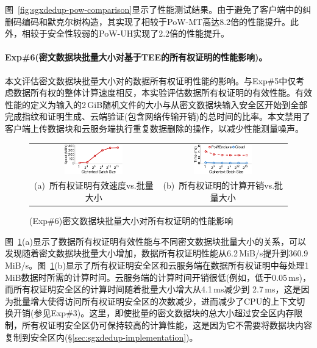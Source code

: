 图~\ref{fig:sgxdedup-pow-comparison}显示了性能测试结果。由于\sysnameS 避免了客户端中的纠删码编码和默克尔树构造，其实现了相较于PoW-MT高达8.2倍的性能提升。此外，\sysnameS 相较于安全性较弱的PoW-UH实现了2.2倍的性能提升。

\paragraph*{Exp\#6(密文数据块批量大小对基于TEE的所有权证明的性能影响)。}本文评估密文数据块批量大小对\sysnameS 的数据所有权证明性能的影响。与Exp\#5中仅考虑数据所有权的整体计算速度相反，本实验评估数据所有权证明的有效性能。有效性能的定义为输入的2\,GiB随机文件的大小与从密文数据块输入安全区开始到全部完成指纹和证明生成、云端验证(包含网络传输开销)的总时间的比率。本文禁用了客户端上传数据块和云服务端执行重复数据删除的操作，以减少性能测量噪声。

\begin{figure}[!htb]
    \centering
    \begin{tabular}{@{\ }c@{\ }c}
        \includegraphics[width=0.48\textwidth]{pic/sgxdedup/expa4_powBatchSize_overall.pdf} & 
        \includegraphics[width=0.48\textwidth]{pic/sgxdedup/expa4_powBatchSize_breakdown.pdf}  \\
        \mbox{\parbox{0.48\textwidth}{\small (a) 所有权证明有效速度vs.批量大小}}            & 
        \mbox{\parbox{0.48\textwidth}{\small (b) 所有权证明的计算开销vs.批量大小}}
    \end{tabular}
    \caption{(Exp\#6)密文数据块批量大小对所有权证明的性能影响}
    \label{fig:sgxdedup-exp-pow-impact}
\end{figure}

图~\ref{fig:sgxdedup-exp-pow-impact}(a)显示了数据所有权证明有效性能与不同密文数据块批量大小的关系，可以发现随着密文数据块批量大小增加，数据所有权证明性能从6.2\,MiB/s提升到360.9\,MiB/s。图~\ref{fig:sgxdedup-exp-pow-impact}(b)显示了所有权证明安全区和云服务端在数据所有权证明中每处理1\,MiB数据时所需的计算时间。云服务端的计算时间开销很低(例如，低于0.05\,ms)，而所有权证明安全区的计算时间随着批量大小增大从4.1\,ms减少到 2.7\,ms，这是因为批量增大使得访问所有权证明安全区的次数减少，进而减少了CPU的上下文切换开销(参见Exp\#3)。这里，即使批量的密文数据块的总大小超过安全区内存限制，所有权证明安全区仍可保持较高的计算性能，这是因为它不需要将数据块内容复制到安全区内(\S\ref{sec:sgxdedup-implementation})。


